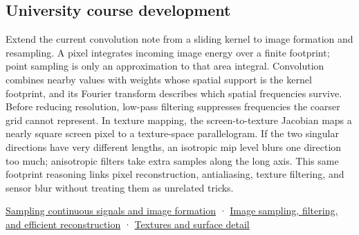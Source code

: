 \subsection{University course development}\label{appendix-d5b3c692d9f0-university-course-development}

Extend the current convolution note from a sliding kernel to image formation and resampling. A pixel integrates incoming image energy over a finite footprint; point sampling is only an approximation to that area integral. Convolution combines nearby values with weights whose spatial support is the kernel footprint, and its Fourier transform describes which spatial frequencies survive. Before reducing resolution, low-pass filtering suppresses frequencies the coarser grid cannot represent. In texture mapping, the screen-to-texture Jacobian maps a nearly square screen pixel to a texture-space parallelogram. If the two singular directions have very different lengths, an isotropic mip level blurs one direction too much; anisotropic filters take extra samples along the long axis. This same footprint reasoning links pixel reconstruction, antialiasing, texture filtering, and sensor blur without treating them as unrelated tricks.

\hyperref[03-visual-computing-i-ch003-sampling-continuous-signals-and-image-formation]{Sampling continuous signals and image formation} · \hyperref[03-visual-computing-i-ch004-image-sampling-filtering-and-efficient-reconstruction]{Image sampling, filtering, and efficient reconstruction} · \hyperref[03-visual-computing-i-ch019-textures-and-surface-detail]{Textures and surface detail}
